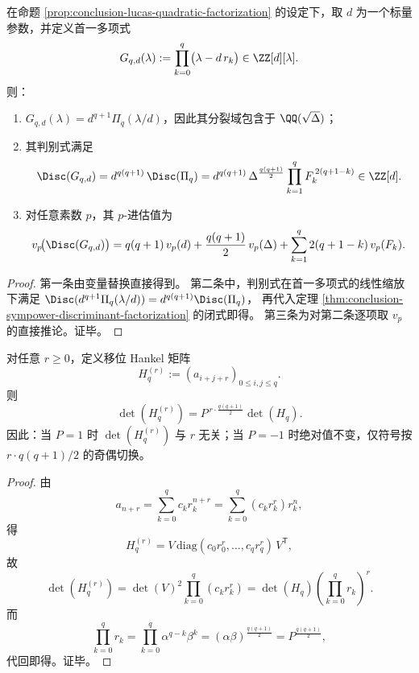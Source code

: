 \begin{corollary}[尺度参数下的体谱多项式与判别式闭式]\label{cor:conclusion-scaled-spectrum-poly-discriminant}
在命题 \ref{prop:conclusion-lucas-quadratic-factorization} 的设定下，取 \(d\) 为一个标量参数，并定义首一多项式
\[
G_{q,d}(\lambda):=\prod_{k=0}^{q}\bigl(\lambda-d\,r_k\bigr)\in\ZZ[d][\lambda].
\]
则：
\begin{enumerate}
  \item \(G_{q,d}(\lambda)=d^{q+1}\Pi_q(\lambda/d)\)，因此其分裂域包含于 \(\QQ(\sqrt{\Delta})\)；
  \item 其判别式满足
  \[
  \Disc(G_{q,d})
  =d^{q(q+1)}\,\Disc(\Pi_q)
  =d^{q(q+1)}\,\Delta^{\frac{q(q+1)}{2}}
  \prod_{k=1}^{q}F_k^{\,2(q+1-k)}\in\ZZ[d].
  \]
  \item 对任意素数 \(p\)，其 \(p\)-进估值为
  \[
  v_p\!\bigl(\Disc(G_{q,d})\bigr)
  =q(q+1)\,v_p(d)
  +\frac{q(q+1)}{2}\,v_p(\Delta)
  +\sum_{k=1}^{q}2(q+1-k)\,v_p(F_k).
  \]
\end{enumerate}
\end{corollary}
\begin{proof}
第一条由变量替换直接得到。
第二条中，判别式在首一多项式的线性缩放下满足
\(
\Disc(d^{q+1}\Pi_q(\lambda/d))=d^{q(q+1)}\Disc(\Pi_q)
\)，
再代入定理 \ref{thm:conclusion-sympower-discriminant-factorization} 的闭式即得。
第三条为对第二条逐项取 \(v_p\) 的直接推论。证毕。
\end{proof}

\begin{proposition}\label{prop:conclusion-shifted-hankel-rigidity}
对任意 \(r\ge 0\)，定义移位 Hankel 矩阵
\[
H_q^{(r)}:=(a_{i+j+r})_{0\le i,j\le q}.
\]
则
\[
\det(H_q^{(r)})
=
P^{\,r\cdot \frac{q(q+1)}{2}}
\det(H_q).
\]
因此：当 \(P=1\) 时 \(\det(H_q^{(r)})\) 与 \(r\) 无关；当 \(P=-1\) 时绝对值不变，仅符号按
\(
r\cdot q(q+1)/2
\)
的奇偶切换。
\end{proposition}
\begin{proof}
由
\[
a_{n+r}=\sum_{k=0}^{q} c_k r_k^{n+r}
=\sum_{k=0}^{q}(c_kr_k^r)r_k^n,
\]
得
\[
H_q^{(r)}=V\,\mathrm{diag}(c_0r_0^r,\dots,c_qr_q^r)\,V^{\mathsf T},
\]
故
\[
\det(H_q^{(r)})
=\det(V)^2\prod_{k=0}^{q}(c_kr_k^r)
=\det(H_q)\left(\prod_{k=0}^{q}r_k\right)^r.
\]
而
\[
\prod_{k=0}^{q}r_k
=\prod_{k=0}^{q}\alpha^{q-k}\beta^k
=(\alpha\beta)^{\frac{q(q+1)}{2}}
=P^{\frac{q(q+1)}{2}},
\]
代回即得。证毕。
\end{proof}

